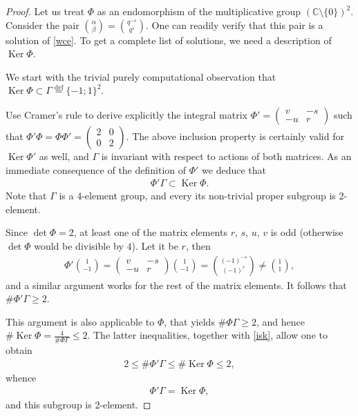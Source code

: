 \documentclass[10pt,a4paper]{amsart}
\numberwithin{equation}{section}
\begin{document}
\begin{proof} Let us treat $\Phi$ as an endomorphism of the multiplicative group $(\mathbb{C}{\setminus}\{0\})^2$. Consider the pair $\binom{\alpha}{\beta}=\binom{q^{-s}}{q^r}$. One can readily verify that this pair is a solution of \eqref{wce}. To get a complete list of solutions, we need a description of $\operatorname{Ker}\Phi$.

We start with the trivial purely computational observation that $\operatorname{Ker}\Phi\subset \Gamma\stackrel{\operatorname{def}}{=}\{-1;1\}^2$.

Use Cramer's rule to derive explicitly the integral matrix $\Phi'=\left(\begin{smallmatrix}v & -s\\ -u & r\end{smallmatrix}\right)$ such that $\Phi'\Phi=\Phi\Phi'=\left(\begin{smallmatrix}2 & 0\\ 0 & 2\end{smallmatrix}\right)$. The above inclusion property is certainly valid for $\operatorname{Ker}\Phi'$ as well, and $\Gamma$ is invariant with respect to actions of both matrices. As an immediate consequence of the definition of $\Phi'$ we deduce that
\begin{gather}\label{isk}
\Phi'\Gamma\subset\operatorname{Ker}\Phi.
\end{gather}
Note that $\Gamma$ is a 4-element group, and every its non-trivial proper subgroup is 2-element.

Since $\det\Phi=2$, at least one of the matrix elements $r$, $s$, $u$, $v$ is odd (otherwise $\det\Phi$ would be divisible by $4$). Let it be $r$, then
\begin{gather*}
\Phi'\binom{1}{-1}=\begin{pmatrix}v & -s\\ -u & r\end{pmatrix}\binom{1}{-1}=\binom{(-1)^{-s}}{(-1)^r}\ne\binom{1}{1},
\end{gather*}
and a similar argument works for the rest of the matrix elements. It follows that $\#\Phi'\Gamma\ge 2$.

This argument is also applicable to $\Phi$, that yields $\#\Phi\Gamma\ge 2$, and hence $\#\operatorname{Ker}\Phi=\frac{4}{\#\Phi\Gamma}\le 2$. The latter inequalities, together with \eqref{isk}, allow one to obtain
\begin{gather*}2\le\#\Phi'\Gamma\le\#\operatorname{Ker}\Phi\le 2,\end{gather*}
whence
\begin{gather*}\Phi'\Gamma=\operatorname{Ker}\Phi,\end{gather*}
and this subgroup is 2-element.


\end{proof}
\end{document}
